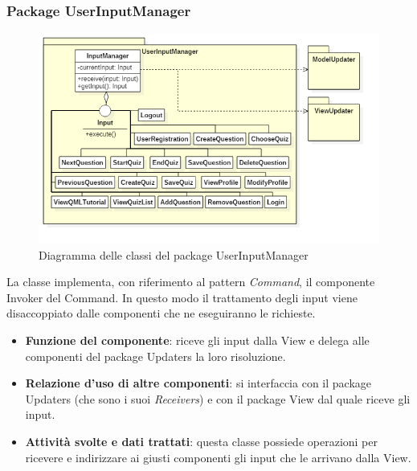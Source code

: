 \documentclass[a4paper,11pt]{article}
\begin{document}
			\subsubsection{Package UserInputManager}
			\begin{figure}[h!]
			\begin{center}
				\includegraphics[scale=0.65]{../images/UserInputManagerClass.png}
				\caption{Diagramma delle classi del package UserInputManager}
			\end{center}
			\end{figure}

			La classe implementa, con riferimento al pattern \emph{Command}, il componente Invoker del Command. In questo modo il trattamento degli input viene disaccoppiato dalle componenti che ne eseguiranno le richieste.
			\begin{itemize}
				\item\textbf{Funzione del componente}: riceve gli input dalla View e delega alle componenti del package Updaters la loro risoluzione.
				\item\textbf{Relazione d'uso di altre componenti}: si interfaccia con il package Updaters (che sono i suoi \emph{Receivers}) e con il package View dal quale riceve gli input.
				\item\textbf{Attività svolte e dati trattati}: questa classe possiede operazioni per ricevere e indirizzare ai giusti componenti gli input che le arrivano dalla View.
			\end{itemize}
			
\end{document}
